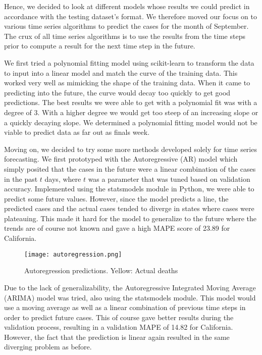 \documentclass[sigconf,nonacm]{acmart}
\begin{document}
Hence, we decided to look at different models whose results we could predict in
accordance with the testing dataset’s format. We therefore moved our focus on
to various time series algorithms to predict the cases for the month of
September. The crux of all time series algorithms is to use the results from
the time steps prior to compute a result for the next time step in the future. 

We first tried a polynomial fitting model using scikit-learn to transform the
data to input into a linear model and match the curve of the training data.
This worked very well as mimicking the shape of the training data. When it came
to predicting into the future, the curve would decay too quickly to get good
predictions. The best results we were able to get with a polynomial fit was
with a degree of 3. With a higher degree we would get too steep of an
increasing slope or a quickly decaying slope. We determined a polynomial
fitting model would not be viable to predict data as far out as finals week. 

Moving on, we decided to try some more methods developed solely for time series forecasting.
We first prototyped with the Autoregressive (AR) model which simply posited
that the cases in the future were a linear combination of the cases in the past
$t$ days, where $t$ was a parameter that was tuned based on validation
accuracy. Implemented using the statsmodels \cite{statsmodels} module in
Python, we were able to predict some future values. However, since the model
predicts a line, the predicted cases and the actual cases tended to diverge in
states where cases were plateauing. This made it hard for the model to
generalize to the future where the trends are of course not known and gave a
high MAPE score of 23.89 for California.

\begin{figure}
  \centering
  \texttt{[image: autoregression.png]}
  \caption{Autoregression predictions. Yellow: Actual deaths}
\end{figure}

Due to the lack of generalizability, the Autoregressive Integrated Moving
Average (ARIMA) model was tried, also using the statsmodels module. This model
would use a moving average as well as a linear combination of previous time
steps in order to predict future cases. This of course gave better results
during the validation process, resulting in a validation MAPE of 14.82 for
California. However, the fact that the prediction is linear again resulted in
the same diverging problem as before.
\end{document}
